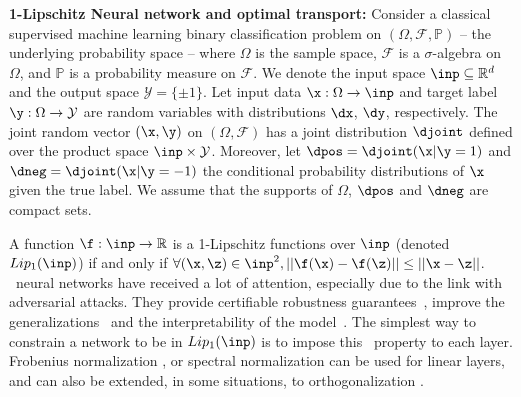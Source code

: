 \textbf{1-Lipschitz Neural network and optimal transport:}
%
Consider a classical supervised machine learning binary classification problem on $(\Omega, \mathcal{F}, \mathbb{P})$ -- the underlying probability space -- where $\Omega$ is the sample space, $\mathcal{F}$ is a $\sigma$-algebra on $\Omega$, and $\mathbb{P}$ is a probability measure on $\mathcal{F}$. 
%
We denote the input space $\inp \subseteq \mathbb{R}^d$ and the output space $\mathcal{Y} = \{\pm 1 \}$. Let input data $\x : \Omega \to \inp$ and target label $\y : \Omega \to \mathcal{Y}$ are random variables with distributions $\dx$, $\dy$, respectively.
%
The joint random vector $(\x, \y)$ on $(\Omega, \mathcal{F})$ has a joint distribution $\djoint$ defined over the product space $\inp \times \mathcal{Y}$.
%
Moreover, let $\dpos = \djoint(\x | \y = 1)$ and $\dneg = \djoint(\x | \y = -1)$ the conditional probability distributions of $\x$ given
the true label.
We assume that the supports of $\Omega$,  $\dpos$ and $\dneg$ are compact sets.


A function $\f :\inp \to \mathbb{R}$ is a 1-Lipschitz functions over $\inp$ (denoted $Lip_1(\inp)$) if and only if $\forall (\x,\z) \in \inp^2, ||\f(\x) -\f(\z) ||\leq || \x-\z||$.
\onlyonelip~neural networks have received a lot of attention, especially due to the link with adversarial attacks. They provide certifiable robustness guarantees~\cite{hein_formal_2017,ono_lightweight_2018}, improve  the generalizations~\cite{Sokolic_2017} and the interpretability of the model~\cite{tsipras2018robustness}. The simplest way to constrain a network to be in $Lip_1(\inp)$ is to impose this \onlyonelip~property to each layer. Frobenius normalization \cite{SalimansK16}, or spectral normalization \cite{Miyato2018SpectralNF} can be used for linear layers, and can also be extended, in some situations, to  orthogonalization \cite{li2019preventing,Achour2021}.


